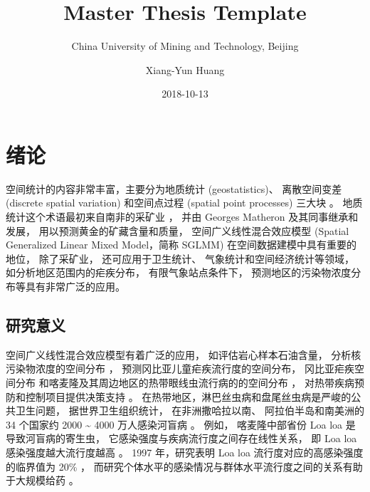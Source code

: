 \documentclass[12pt,a4paper,UTF8,twoside]{book}
\title{Master Thesis Template}
\subtitle{China University of Mining and Technology, Beijing}
\author{Xiang-Yun Huang}
\date{2018-10-13}
\theoremstyle{definition}
\theoremstyle{definition}
\theoremstyle{definition}
\theoremstyle{remark}
\begin{document}





{
\setcounter{tocdepth}{2}
\tableofcontents
}

\mainmatter

\hypertarget{intro}{%
\chapter{绪论}\label{intro}}

空间统计的内容非常丰富，主要分为地质统计 (geostatistics)、 离散空间变差
(discrete spatial variation) 和空间点过程 (spatial point processes)
三大块 \citep{Cressie1993}。 地质统计这个术语最初来自南非的采矿业
\citep{Krige1951}， 并由 Georges Matheron 及其同事继承和发展，
用以预测黄金的矿藏含量和质量， 空间广义线性混合效应模型 (Spatial
Generalized Linear Mixed Model，简称 SGLMM)
在空间数据建模中具有重要的地位， 除了采矿业， 还可应用于卫生统计、
气象统计和空间经济统计等领域， 如分析地区范围内的疟疾分布，
有限气象站点条件下， 预测地区的污染物浓度分布等具有非常广泛的应用。

\hypertarget{motivations}{%
\section{研究意义}\label{motivations}}

空间广义线性混合效应模型有着广泛的应用， 如评估岩心样本石油含量，
分析核污染物浓度的空间分布 \citep{Diggle1998}，
预测冈比亚儿童疟疾流行度的空间分布， 冈比亚疟疾空间分布
\citep{Thomson1999, Diggle2002Childhood}
和喀麦隆及其周边地区的热带眼线虫流行病的的空间分布
\citep{Diggle2007ATMP}， 对热带疾病预防和控制项目提供决策支持
\citep{Schl2016Using}。
在热带地区，淋巴丝虫病和盘尾丝虫病是严峻的公共卫生问题，
据世界卫生组织统计， 在非洲撒哈拉以南、 阿拉伯半岛和南美洲的 34 个国家约
2000 \textasciitilde{} 4000 万人感染河盲病 \citep{Takougang2002Rapid}。
例如， 喀麦隆中部省份 Loa loa 是导致河盲病的寄生虫，
它感染强度与疾病流行度之间存在线性关系， 即 Loa loa
感染强度越大流行度越高 \citep{Boussinesq2001}。 1997 年，研究表明 Loa
loa 流行度对应的高感染强度的临界值为 20\% \citep{Gardon1997Serious}，
而研究个体水平的感染情况与群体水平流行度之间的关系有助于大规模给药
\citep{Schl2016Using}。
\end{document}
